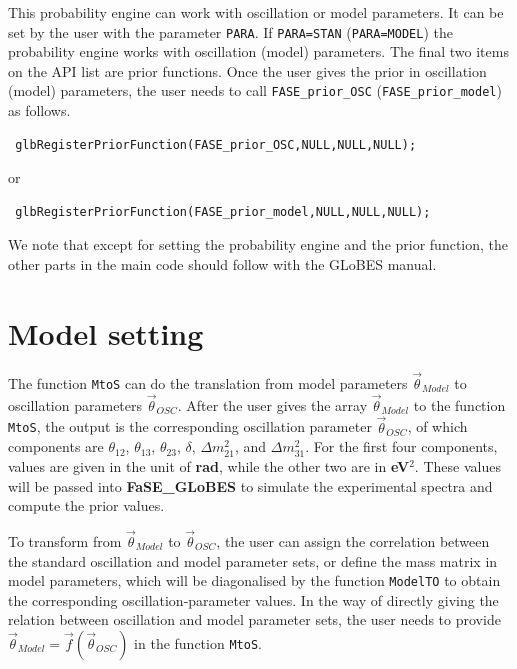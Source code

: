 \documentclass[aps,prd,nofootinbib,preprint]{revtex4}
\begin{document}
This probability engine can work with oscillation or model parameters. It can be set by the user with the parameter \texttt{PARA}. If \texttt{PARA=STAN} (\texttt{PARA=MODEL}) the probability engine works with oscillation (model) parameters. The final two items on the API list are prior functions. Once the user gives the prior in oscillation (model) parameters, the user needs to call \texttt{FASE\_prior\_OSC} (\texttt{FASE\_prior\_model}) as follows.
\begin{verbatim}
 glbRegisterPriorFunction(FASE_prior_OSC,NULL,NULL,NULL);
\end{verbatim}
or
\begin{verbatim}
 glbRegisterPriorFunction(FASE_prior_model,NULL,NULL,NULL);
\end{verbatim}

We note that except for setting the probability engine and the prior function, the other parts in the main code should follow with the GLoBES manual. 


\section{Model setting}\label{sec:model_set}

The function \texttt{MtoS} can do the translation from model parameters $\vec{\theta}_{Model}$ to oscillation parameters $\vec{\theta}_{OSC}$. After the user gives the array $\vec{\theta}_{Model}$ to the function \texttt{MtoS}, the output is the corresponding oscillation parameter $\vec{\theta}_{OSC}$, of which components are $\theta_{12}$, $\theta_{13}$, $\theta_{23}$, $\delta$, $\Delta m_{21}^2$, and $\Delta m_{31}^2$. For the first four components, values are given in the unit of \textbf{rad}, while the other two are in \textbf{eV$^2$}. These values will be passed into \textbf{FaSE\_GLoBES} to simulate 
the experimental spectra and compute the prior values.


To transform from $\vec{\theta}_{Model}$ to $\vec{\theta}_{OSC}$, the user can assign the correlation between the standard oscillation and model parameter sets, or define the mass matrix in model parameters, which will be diagonalised by the function \texttt{ModelTO} to obtain the corresponding oscillation-parameter values. 
In the way of directly giving the relation between oscillation and model parameter sets, the user needs to provide
$\vec{\theta}_{Model}=\vec{f}(\vec{\theta}_{OSC})$ in the function \texttt{MtoS}.
%
\end{document}
